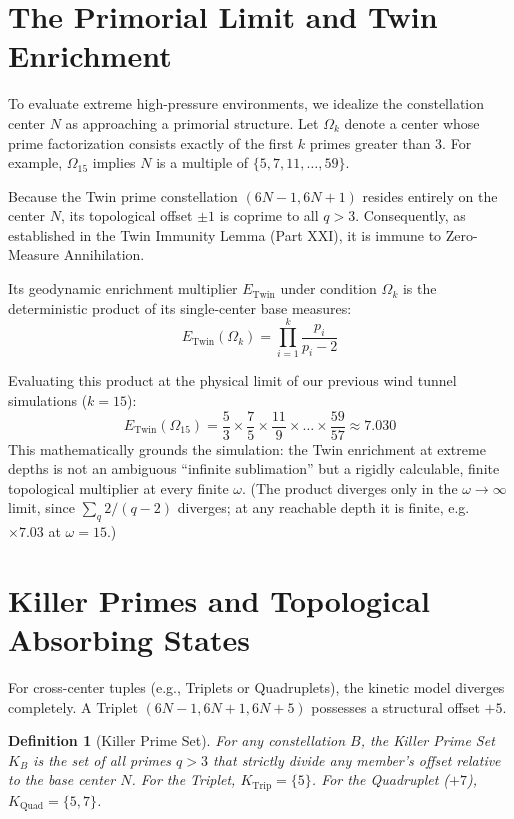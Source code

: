 \documentclass[11pt,a4paper]{article}
\newtheorem{definition}{Definition}
\begin{document}
\section{The Primorial Limit and Twin Enrichment}

To evaluate extreme high-pressure environments, we idealize the constellation center $N$ as approaching a primorial structure. Let $\Omega_k$ denote a center whose prime factorization consists exactly of the first $k$ primes greater than 3. For example, $\Omega_{15}$ implies $N$ is a multiple of $\{5, 7, 11, \dots, 59\}$.

Because the Twin prime constellation $(6N-1, 6N+1)$ resides entirely on the center $N$, its topological offset $\pm 1$ is coprime to all $q > 3$. Consequently, as established in the Twin Immunity Lemma (Part XXI), it is immune to Zero-Measure Annihilation. 

Its geodynamic enrichment multiplier $E_{\text{Twin}}$ under condition $\Omega_k$ is the deterministic product of its single-center base measures:
\begin{equation}
E_{\text{Twin}}(\Omega_k) = \prod_{i=1}^{k} \frac{p_i}{p_i - 2}
\end{equation}

Evaluating this product at the physical limit of our previous wind tunnel simulations ($k=15$):
\begin{equation}
E_{\text{Twin}}(\Omega_{15}) = \frac{5}{3} \times \frac{7}{5} \times \frac{11}{9} \times \dots \times \frac{59}{57} \approx \mathbf{7.030}
\end{equation}
This mathematically grounds the simulation: the Twin enrichment at extreme depths is not an ambiguous ``infinite sublimation'' but a rigidly calculable, finite topological multiplier at every finite $\omega$. (The product diverges only in the $\omega\to\infty$ limit, since $\sum_q 2/(q-2)$ diverges; at any reachable depth it is finite, e.g.\ $\times7.03$ at $\omega=15$.)

\section{Killer Primes and Topological Absorbing States}

For cross-center tuples (e.g., Triplets or Quadruplets), the kinetic model diverges completely. A Triplet $(6N-1, 6N+1, 6N+5)$ possesses a structural offset $+5$.

\begin{definition}[Killer Prime Set]
For any constellation $B$, the Killer Prime Set $K_B$ is the set of all primes $q>3$ that strictly divide any member's offset relative to the base center $N$. For the Triplet, $K_{\text{Trip}} = \{5\}$. For the Quadruplet ($+7$), $K_{\text{Quad}} = \{5, 7\}$.
\end{definition}
\end{document}

